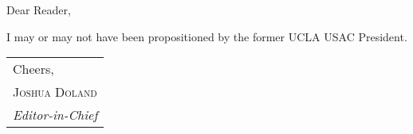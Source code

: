 \noindent Dear Reader,
\bigbreak

I may or may not have been propositioned by the former UCLA USAC President. 

\bigbreak
\hfill
\begin{tabular}{@{}l@{}}
	Cheers,	\\
	\scshape Joshua Doland \\
	\textit{Editor-in-Chief}
\end{tabular}